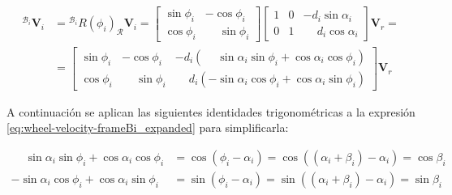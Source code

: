 \documentclass[11pt,a4paper]{article}
\newcommand{\vect}[1]{\bm{#1}}       %
\newcommand{\frameR}{\mathcal{R}}
\newcommand{\frameBi}{\mathcal{B}_i}
\begin{document}
\begin{equation}
    \begin{aligned}
        {}^{\frameBi} \vect{V}_i & = {}^{\frameBi} R(\phi_i)_{\frameR} \vect{V}_{i} = \begin{bmatrix}
                                                                                          \sin\phi_i & -\cos\phi_i           \\
                                                                                          \cos\phi_i & \phantom{-}\sin\phi_i
                                                                                      \end{bmatrix} \begin{bmatrix}
                                                                                                        1 & 0 & -d_{i} \sin\alpha_i           \\
                                                                                                        0 & 1 & \phantom{-}d_{i} \cos\alpha_i
                                                                                                    \end{bmatrix} \vect{V}_r =  \\
                                 & = \begin{bmatrix}
                                         \sin\phi_i & -\cos\phi_i           & -d_i(\phantom{-}\sin\alpha_i\sin\phi_i + \cos\alpha_i\cos\phi_i) \\
                                         \cos\phi_i & \phantom{-}\sin\phi_i & \phantom{-}d_i(-\sin\alpha_i\cos\phi_i + \cos\alpha_i\sin\phi_i)
                                     \end{bmatrix} \vect{V}_r
    \end{aligned}
    \label{eq:wheel-velocity-frameBi_expanded}
\end{equation}

A continuación se aplican las siguientes identidades trigonométricas a la expresión \ref{eq:wheel-velocity-frameBi_expanded} para simplificarla:

\[
    \begin{aligned}
        \phantom{-}\sin\alpha_i\sin\phi_i + \cos\alpha_i\cos\phi_i & = \cos(\phi_i - \alpha_i) = \cos((\alpha_i + \beta_i) - \alpha_i) = \cos\beta_i \\
        -\sin\alpha_i\cos\phi_i + \cos\alpha_i\sin\phi_i           & = \sin(\phi_i - \alpha_i) = \sin((\alpha_i + \beta_i) - \alpha_i) = \sin\beta_i
    \end{aligned}
\]
\end{document}

